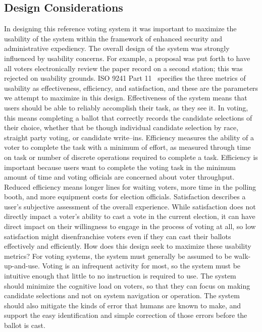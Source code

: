 \subsection{Design Considerations}
In designing this reference voting system it was important to maximize the usability of the system within the framework of enhanced security and administrative expediency. The overall design of the system was strongly influenced by usability concerns. For example, a proposal was put forth to have all voters electronically review the paper record on a second station; this was rejected on usability grounds.
ISO 9241 Part 11~\cite{iso1998} specifies the three metrics of usability as effectiveness, efficiency, and satisfaction, and these are the parameters we attempt to maximize in this design. Effectiveness of the system means that users should be able to reliably accomplish their task, as they see it. In voting, this means completing a ballot that correctly records the candidate selections of their choice, whether that be though individual candidate selection by race, straight party voting, or candidate write–ins. Efficiency measures the ability of a voter to complete the task with a minimum of effort, as measured through time on task or number of discrete operations required to complete a task. Efficiency is important because users want to complete the voting task in the minimum amount of time and voting officials are concerned about voter throughput. Reduced efficiency means longer lines for waiting voters, more time in the polling booth, and more equipment costs for election officials. Satisfaction describes a user's subjective assessment of the overall experience. While satisfaction does not directly impact a voter's ability to cast a vote in the current election, it can have direct impact on their willingness to engage in the process of voting at all, so low satisfaction might disenfranchise voters even if they can cast their ballots effectively and efficiently. 
How does this design seek to maximize these usability metrics? For voting systems, the system must generally be assumed to be walk-up-and-use. Voting is an infrequent activity for most, so the system must be intuitive enough that little to no instruction is required to use. The system should minimize the cognitive load on voters, so that they can focus on making candidate selections and not on system navigation or operation. The system should also mitigate the kinds of error that humans are known to make, and support the easy identification and simple correction of those errors before the ballot is cast. 

